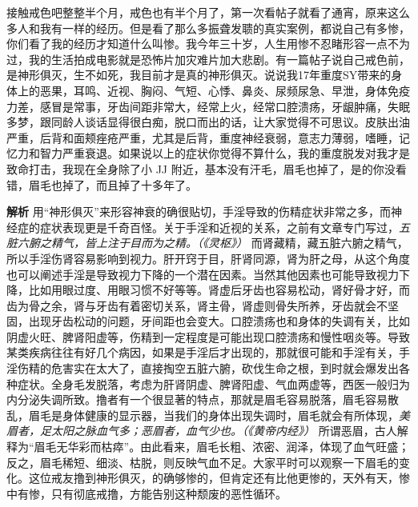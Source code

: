 \begin{case}[神经衰弱]
    接触戒色吧整整半个月，戒色也有半个月了，第一次看帖子就看了通宵，原来这么多人和我有一样的经历。但是看了那么多振聋发聩的真实案例，都说自己有多惨，你们看了我的经历才知道什么叫惨。我今年三十岁，人生用惨不忍睹形容一点不为过，我的生活拍成电影就是恐怖片加灾难片加大悲剧。有一篇帖子说自己戒色前，是神形俱灭，生不如死，我目前才是真的神形俱灭。说说我17年重度SY带来的身体上的恶果，耳鸣、近视、胸闷、气短、心悸、鼻炎、尿频尿急、早泄，身体免疫力差，感冒是常事，牙齿间距非常大，经常上火，经常口腔溃疡，牙龈肿痛，失眠多梦，跟同龄人谈话显得很白痴，脱口而出的话，让大家觉得不可思议。皮肤出油严重，后背和面颊痤疮严重，尤其是后背，重度神经衰弱，意志力薄弱，嗜睡，记忆力和智力严重衰退。如果说以上的症状你觉得不算什么，我的重度脱发对我才是致命打击，我现在全身除了小 JJ 附近，基本没有汗毛，眉毛也掉了，是的你没看错，眉毛也掉了，而且掉了十多年了。

    \textbf{解析} 用“神形俱灭”来形容神衰的确很贴切，手淫导致的伤精症状非常之多，而神经症的症状表现更是千奇百怪。关于手淫和近视的关系，之前有文章专门写过，\textit{五脏六腑之精气，皆上注于目而为之精。（《灵枢》）} 而肾藏精，藏五脏六腑之精气，所以手淫伤肾容易影响到视力。肝开窍于目，肝肾同源，肾为肝之母，从这个角度也可以阐述手淫是导致视力下降的一个潜在因素。当然其他因素也可能导致视力下降，比如用眼过度、用眼习惯不好等等。肾虚后牙齿也容易松动，肾好骨才好，而齿为骨之余，肾与牙齿有着密切关系，肾主骨，肾虚则骨失所养，牙齿就会不坚固，出现牙齿松动的问题，牙间距也会变大。口腔溃疡也和身体的失调有关，比如阴虚火旺、脾肾阳虚等，伤精到一定程度是可能出现口腔溃疡和慢性咽炎等。导致某类疾病往往有好几个病因，如果是手淫后才出现的，那就很可能和手淫有关，手淫伤精的危害实在太大了，直接掏空五脏六腑，砍伐生命之根，到时就会爆发出各种症状。全身毛发脱落，考虑为肝肾阴虚、脾肾阳虚、气血两虚等，西医一般归为内分泌失调所致。撸者有一个很显著的特点，那就是眉毛容易脱落，眉毛容易散乱，眉毛是身体健康的显示器，当我们的身体出现失调时，眉毛就会有所体现，\textit{美眉者，足太阳之脉血气多；恶眉者，血气少也。（《黄帝内经》）} 所谓恶眉，古人解释为“眉毛无华彩而枯瘁”。由此看来，眉毛长粗、浓密、润泽，体现了血气旺盛；反之，眉毛稀短、细淡、枯脱，则反映气血不足。大家平时可以观察一下眉毛的变化。这位戒友撸到神形俱灭，的确够惨的，但肯定还有比他更惨的，天外有天，惨中有惨，只有彻底戒撸，方能告别这种颓废的恶性循环。
\end{case}

